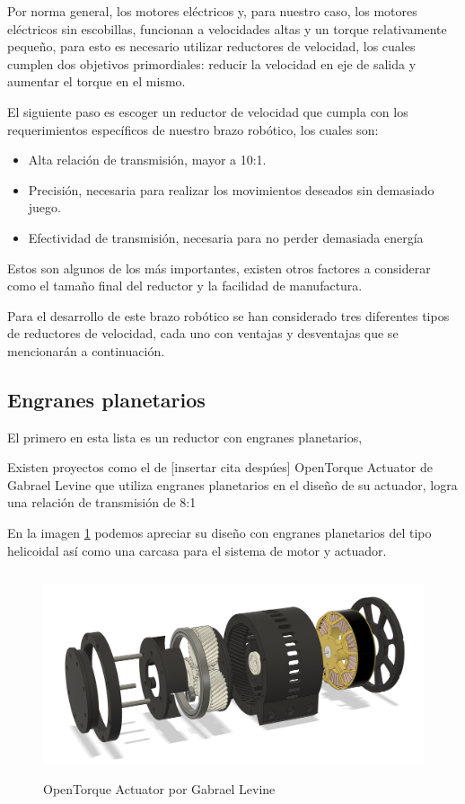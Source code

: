 Por norma general, los motores eléctricos y, para nuestro caso, los motores eléctricos sin escobillas, funcionan a velocidades altas y un torque relativamente pequeño, para esto es necesario utilizar reductores de velocidad, los cuales cumplen dos objetivos primordiales: reducir la velocidad en eje de salida y aumentar el torque en el mismo.

El siguiente paso es escoger un reductor de velocidad que cumpla con los requerimientos específicos de nuestro brazo robótico, los cuales son:

\begin{itemize}
\item Alta relación de transmisión, mayor a 10:1.
\item Precisión, necesaria para realizar los movimientos deseados sin demasiado juego. 
\item Efectividad de transmisión, necesaria para no perder demasiada energía
\end{itemize}

Estos son algunos de los más importantes, existen otros factores a considerar como el tamaño final del reductor y la facilidad de manufactura.

Para el desarrollo de este brazo robótico se han considerado tres diferentes tipos de reductores de velocidad, cada uno con ventajas y desventajas que se mencionarán a continuación.

\subsection{Engranes planetarios}

El primero en esta lista es un reductor con engranes planetarios, 

Existen proyectos como el de [insertar cita despúes] OpenTorque Actuator de Gabrael Levine que utiliza engranes planetarios en el diseño de su actuador, logra una relación de transmisión de 8:1

En la imagen \ref{fig:opentorque} podemos apreciar su diseño con engranes planetarios del tipo  helicoidal así como una carcasa para el sistema de motor y actuador. 

\begin{figure}[h]
    \centering
    \includegraphics[width=15cm, height=6cm, keepaspectratio]{./img/chapter6/opentorque.png}
    \caption{OpenTorque Actuator por Gabrael Levine}
    \label{fig:opentorque}
\end{figure}

